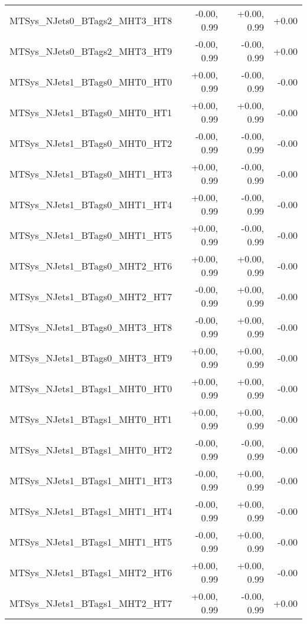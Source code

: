 \begin{tabular}{|l|r|r|r|}
MTSys\_NJets0\_BTags2\_MHT3\_HT8         &      -0.00, 0.99 &     +0.00, 0.99 &  +0.00 \\
MTSys\_NJets0\_BTags2\_MHT3\_HT9         &      -0.00, 0.99 &     -0.00, 0.99 &  +0.00 \\
MTSys\_NJets1\_BTags0\_MHT0\_HT0         &      +0.00, 0.99 &     -0.00, 0.99 &  -0.00 \\
MTSys\_NJets1\_BTags0\_MHT0\_HT1         &      +0.00, 0.99 &     +0.00, 0.99 &  -0.00 \\
MTSys\_NJets1\_BTags0\_MHT0\_HT2         &      -0.00, 0.99 &     -0.00, 0.99 &  -0.00 \\
MTSys\_NJets1\_BTags0\_MHT1\_HT3         &      +0.00, 0.99 &     -0.00, 0.99 &  -0.00 \\
MTSys\_NJets1\_BTags0\_MHT1\_HT4         &      +0.00, 0.99 &     -0.00, 0.99 &  -0.00 \\
MTSys\_NJets1\_BTags0\_MHT1\_HT5         &      +0.00, 0.99 &     -0.00, 0.99 &  -0.00 \\
MTSys\_NJets1\_BTags0\_MHT2\_HT6         &      +0.00, 0.99 &     +0.00, 0.99 &  -0.00 \\
MTSys\_NJets1\_BTags0\_MHT2\_HT7         &      -0.00, 0.99 &     +0.00, 0.99 &  -0.00 \\
MTSys\_NJets1\_BTags0\_MHT3\_HT8         &      -0.00, 0.99 &     +0.00, 0.99 &  -0.00 \\
MTSys\_NJets1\_BTags0\_MHT3\_HT9         &      +0.00, 0.99 &     +0.00, 0.99 &  -0.00 \\
MTSys\_NJets1\_BTags1\_MHT0\_HT0         &      +0.00, 0.99 &     +0.00, 0.99 &  -0.00 \\
MTSys\_NJets1\_BTags1\_MHT0\_HT1         &      +0.00, 0.99 &     +0.00, 0.99 &  -0.00 \\
MTSys\_NJets1\_BTags1\_MHT0\_HT2         &      -0.00, 0.99 &     -0.00, 0.99 &  -0.00 \\
MTSys\_NJets1\_BTags1\_MHT1\_HT3         &      -0.00, 0.99 &     +0.00, 0.99 &  -0.00 \\
MTSys\_NJets1\_BTags1\_MHT1\_HT4         &      -0.00, 0.99 &     +0.00, 0.99 &  -0.00 \\
MTSys\_NJets1\_BTags1\_MHT1\_HT5         &      -0.00, 0.99 &     +0.00, 0.99 &  -0.00 \\
MTSys\_NJets1\_BTags1\_MHT2\_HT6         &      +0.00, 0.99 &     +0.00, 0.99 &  -0.00 \\
MTSys\_NJets1\_BTags1\_MHT2\_HT7         &      +0.00, 0.99 &     -0.00, 0.99 &  +0.00 \\

\end{tabular}
